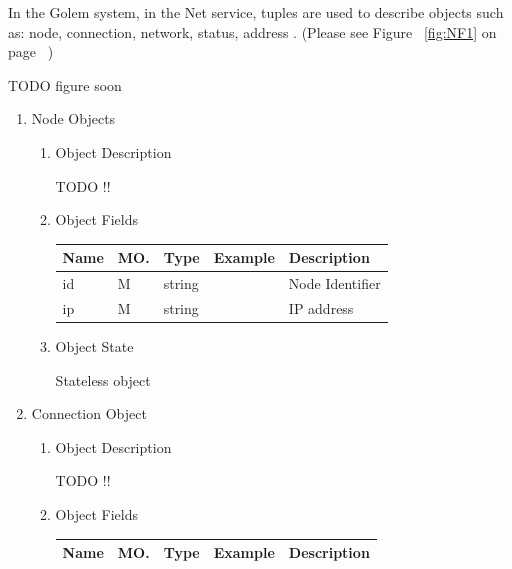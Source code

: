 In the Golem system, in the Net service, tuples are used to describe objects such as:
node, connection, network, status, address . (Please see Figure ~\ref{fig:NF1} on page ~\pageref{fig:NF1})

TODO figure soon

\begin{enumerate}

\item Node Objects

\begin{enumerate}

\item Object Description

TODO !!

\item Object Fields

\begin{table}[H]
\footnotesize
\begin{center}
\begin{tabular}{|p{3cm}|l|p{3cm}|p{3cm}|p{4cm}|} 
\hline
\rowcolor{lightgray}	Name	& MO.	& Type	& Example & 	Description \\
\hline

id 	& M & string & 		& Node Identifier \\
\hline 		

ip & M & string  & 		& IP address \\
\hline

\end{tabular}
\end{center}
\end{table}

\item Object State

Stateless object

\end{enumerate}

\item Connection Object

\begin{enumerate}

\item Object Description

TODO !!

\item Object Fields

\begin{table}[H]
\footnotesize
\begin{center}
\begin{tabular}{|p{3cm}|l|p{3cm}|p{3cm}|p{4cm}|} 
\hline
\rowcolor{lightgray}	Name	& MO.	& Type	& Example & 	Description \\
\hline


\end{tabular}
\end{center}
\end{table}
\end{enumerate}
\end{enumerate}
